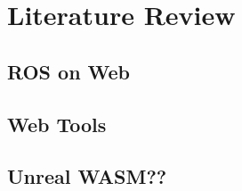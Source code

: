 \chapter{Literature Review}\label{cha:literature}


\section{ROS on Web}\label{sec:ros_on_web}

\section{Web Tools}\label{sec:web_tools}

\section{Unreal WASM??}